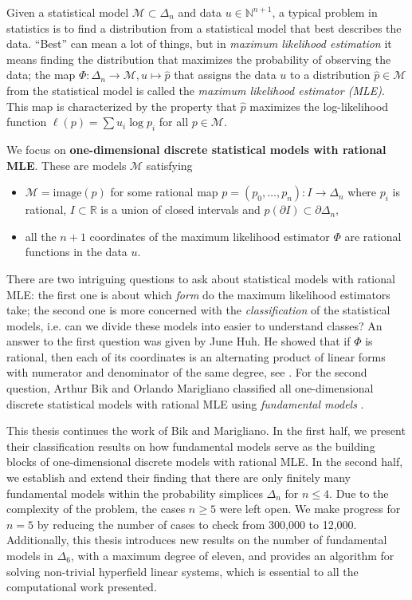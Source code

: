 Given a statistical model \( \mathcal{M} \subset \Delta_n \) and data \( u \in \mathbb{N}^{n+1} \), a typical problem in statistics is to find a distribution from a statistical model that best describes the data. ``Best'' can mean a lot of things, but in \emph{maximum likelihood estimation} it means finding the distribution that maximizes the probability of observing the data; the map \( \Phi: \Delta_n \to \mathcal{M}, u \mapsto \hat p \) that assigns the data \( u \) to a distribution \( \hat p \in \mathcal{M}\) from the statistical model is called the \emph{maximum likelihood estimator (MLE)}. This map is characterized by the property that \( \hat p \) maximizes the log-likelihood function \( \ell(p) = \sum u_i \log p_i \) for all \( p \in \mathcal{M} \). 

We focus on \textbf{{one-dimensional {discrete} {statistical} {models} with rational MLE}}. These are models \( \mathcal{M} \) satisfying 
\begin{itemize}
    \item \( \mathcal{M} = \mathrm{image}(p) \) for some rational map \( p = (p_0, \dots, p_n): I \to \Delta_n \) where \( p_i \) is rational, \( I \subset \mathbb{R} \) is a union of closed intervals and  \( p(\partial I) \subset \partial \Delta_n \),
    \item all the \( n+1 \) coordinates of the maximum likelihood estimator \( \Phi \) are rational functions in the data \( u \).
\end{itemize}
There are two intriguing questions to ask about statistical models with rational MLE: the first one is about which \emph{form} do the maximum likelihood estimators take; the second one is more concerned with the \emph{classification} of the statistical models, i.e. can we divide these models into easier to understand classes? An answer to the first question was given by June Huh. He showed that if \( \Phi \) is rational, then each of its coordinates is an alternating product of linear forms with numerator and denominator of the same degree, see \cite{huh2013varieties, duarte2021discrete}. For the second question, Arthur Bik and Orlando Marigliano classified all one-dimensional discrete statistical models with rational MLE using \emph{fundamental models} \cite{bik2022classifying}.

This thesis continues the work of Bik and Marigliano. In the first half, we present their classification results on how fundamental models serve as the building blocks of one-dimensional discrete models with rational MLE. In the second half, we establish and extend their finding that there are only finitely many fundamental models within the probability simplices \( \Delta_n  \) for \( n \leq 4 \). Due to the complexity of the problem, the cases \( n \geq 5 \) were left open. We make progress for \( n = 5 \) by reducing the number of cases to check from 300,000 to 12,000. Additionally, this thesis introduces new results on the number of fundamental models in \( \Delta_6 \), with a maximum degree of eleven, and provides an algorithm for solving non-trivial hyperfield linear systems, which is essential to all the computational work presented.

